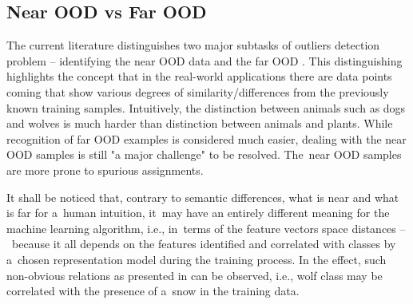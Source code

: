 \subsection{Near OOD vs Far OOD}
\label{section:near-far-ood}

The current literature distinguishes two major subtasks of outliers detection problem – identifying the near OOD data and the far OOD \cite{Winkens-2020}. This distinguishing highlights the concept that in the real-world applications there are data points coming that show various degrees of similarity/differences from the previously known training samples. Intuitively, the distinction between animals such as dogs and wolves is much harder than distinction between animals and plants. While recognition of far OOD examples is considered much easier, dealing with the near OOD samples is still "a major challenge" \cite{Fort-2021} to be resolved. The~near OOD samples are more prone to spurious assignments.

It shall be noticed that, contrary to semantic differences, what is near and what is far for a~human intuition, it~may have an entirely different meaning for the machine learning algorithm, i.e., in~terms of the feature vectors space distances –~because it all depends on the features identified and correlated with classes by a~chosen representation model during the training process. In the effect, such non-obvious relations as presented in \cite{Ribeiro-2016} can be observed, i.e., wolf class may be correlated with the presence of a~snow in the training data.

